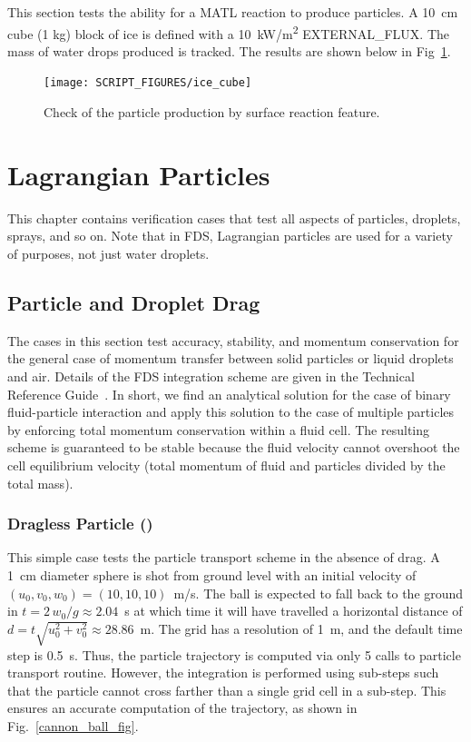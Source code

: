 \documentclass[11pt]{book}
\begin{document}
This section tests the ability for a {\ct MATL} reaction to produce particles. A 10~cm cube (1 kg) block of ice is defined with a 10~\si{kW/m^2} {\ct EXTERNAL\_FLUX}. The mass of water drops produced is tracked. The results are shown below in Fig~\ref{fig:ice_cube}.

\begin{figure}[!ht]
    \centering
    \texttt{[image: SCRIPT\_FIGURES/ice\_cube]}
    \caption[Check of the particle production by surface reaction feature (the {\ct ice\_cube} case)]{Check of the particle production by surface reaction feature.}
    \label{fig:ice_cube}
\end{figure}



\chapter{Lagrangian Particles}

This chapter contains verification cases that test all aspects of particles, droplets, sprays, and so on. Note that in FDS, Lagrangian particles are used for a variety of purposes, not just water droplets.

\section{Particle and Droplet Drag}

The cases in this section test accuracy, stability, and momentum conservation for the general case of momentum transfer between solid particles or liquid droplets and air. Details of the FDS integration scheme are given in the Technical Reference Guide~\cite{FDS_Tech_Guide}.  In short, we find an analytical solution for the case of binary fluid-particle interaction and apply this solution to the case of multiple particles by enforcing total momentum conservation within a fluid cell.  The resulting scheme is guaranteed to be stable because the fluid velocity cannot overshoot the cell equilibrium velocity (total momentum of fluid and particles divided by the total mass).

\subsection{Dragless Particle (\texorpdfstring{}{cannon\_ball})}
\label{cannon_ball}

This simple case tests the particle transport scheme in the absence of drag. A 1~cm diameter sphere is shot from ground level with an initial velocity of $(u_0,v_0,w_0)=(10,10,10)$~m/s. The ball is expected to fall back to the ground in $t=2\, w_0/g\approx 2.04$~s at which time it will have travelled a horizontal distance of $d=t \sqrt{u_0^2+v_0^2}\approx 28.86$~m. The grid has a resolution of 1~m, and the default time step is 0.5~s. Thus, the particle trajectory is computed via only 5 calls to particle transport routine. However, the integration is performed using sub-steps such that the particle cannot cross farther than a single grid cell in a sub-step. This ensures an accurate computation of the trajectory, as shown in Fig.~\ref{cannon_ball_fig}.
\end{document}
